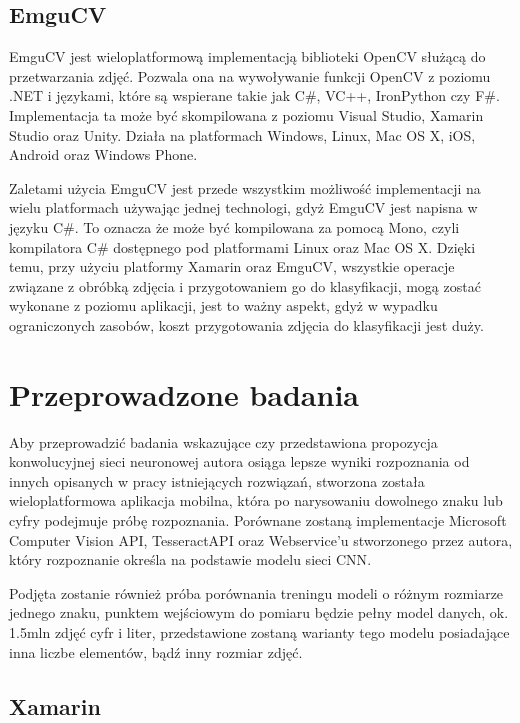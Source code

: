 \documentclass[brudnopis]{xmgr}
\begin{document}
\section{EmguCV}

EmguCV\cite{18} jest wieloplatformową implementacją biblioteki OpenCV służącą do przetwarzania zdjęć. Pozwala ona na wywoływanie funkcji OpenCV z poziomu .NET i językami, które są wspierane takie jak C\#, VC++, IronPython czy F\#. Implementacja ta może być skompilowana z poziomu Visual Studio, Xamarin Studio oraz Unity. Działa na platformach Windows, Linux, Mac OS X, iOS, Android oraz Windows Phone.

Zaletami użycia EmguCV jest przede wszystkim możliwość implementacji na wielu platformach używając jednej technologi, gdyż EmguCV jest napisna w języku C\#. To oznacza że może być kompilowana za pomocą Mono, czyli kompilatora C\# dostępnego pod platformami Linux oraz Mac OS X. Dzięki temu, przy użyciu platformy Xamarin oraz EmguCV, wszystkie operacje związane z obróbką zdjęcia i przygotowaniem go do klasyfikacji, mogą zostać wykonane z poziomu aplikacji, jest to ważny aspekt, gdyż w wypadku ograniczonych zasobów, koszt przygotowania zdjęcia do klasyfikacji jest duży.

\chapter{Przeprowadzone badania}

Aby przeprowadzić badania wskazujące czy przedstawiona propozycja konwolucyjnej sieci neuronowej autora osiąga lepsze wyniki rozpoznania od innych opisanych w pracy istniejących rozwiązań, stworzona została wieloplatformowa aplikacja mobilna, która po narysowaniu dowolnego znaku lub cyfry podejmuje próbę rozpoznania.
Porównane zostaną implementacje Microsoft Computer Vision API\cite{9}, TesseractAPI\cite{10} oraz Webservice'u\cite{5} stworzonego przez autora, który rozpoznanie określa na podstawie modelu sieci CNN\cite{14}.

Podjęta zostanie również próba porównania treningu modeli o różnym rozmiarze jednego znaku, punktem wejściowym do pomiaru będzie pełny model danych, ok. 1.5mln zdjęć cyfr i liter, przedstawione zostaną warianty tego modelu posiadające inna liczbe elementów, bądź inny rozmiar zdjęć.

\section{Xamarin}
\end{document}
